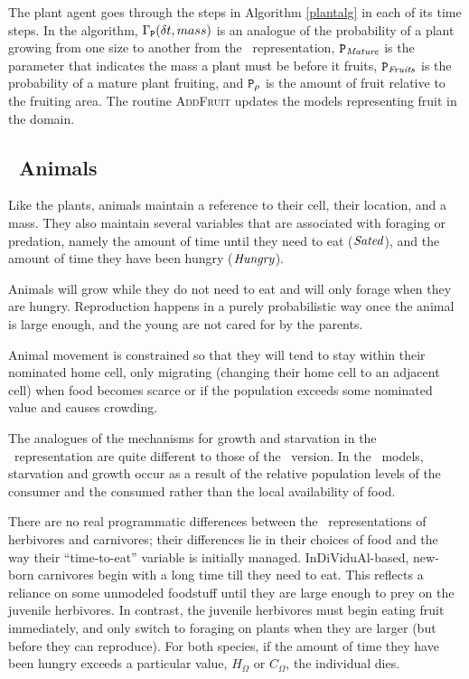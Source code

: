 
The plant agent goes through the steps in Algorithm {\ref{plantalg}} in each
of its time steps. In the algorithm, $\Gamma_{\mathtt{P}}(\delta t, mass)$ is an
analogue of the probability of a plant growing from one size to another from
the \SD\ rep\-re\-sen\-ta\-tion, $\texttt{P}_{\mathit{Mature}}$ is the parameter that indicates
the mass a plant must be before it fruits, $\texttt{P}_{\mathit{Fruits}}$ is the
probability of a mature plant fruiting, and $\texttt{P}_\rho$ is the amount of
fruit relative to the fruiting area. The routine \textsc{AddFruit} updates the
models representing fruit in the domain.

\subsection{\IB\ Animals}

Like the plants, animals maintain a reference to their cell, their
location, and a mass. They also maintain several variables that are
associated with foraging or predation, namely the amount of time until
they need to eat ($\mathit{Sated}$), and the amount of time they have been
hungry ($\mathit{Hungry}$).

Animals will grow while they do not need to eat and will only forage
when they are hungry.  Reproduction happens in a purely probabilistic
way once the animal is large enough, and the young are not cared for
by the parents.

Animal movement is constrained so that they will tend to stay within
their nominated home cell, only migrating (changing their home cell to
an adjacent cell) when food becomes scarce or if the population
exceeds some nominated value and causes crowding.

The analogues of the mechanisms for growth and starvation in the
\SD\ rep\-re\-sen\-ta\-tion are quite different to those of the \IB\ version.
In the \SD\ models, starvation and growth occur as a result of the
relative population levels of the consumer and the consumed rather
than the local availability of food.

There are no real programmatic differences between the
\IB\ rep\-re\-sen\-ta\-tions of herbivores and carnivores; their differences
lie in their choices of food and the way their ``time-to-eat''
variable is initially managed. In\-Di\-Vidu\-Al-based, new-born carnivores
begin with a long time till they need to eat. This reflects a reliance
on some unmodeled foodstuff until they are large enough to prey on
the juvenile herbivores.  In contrast, the juvenile herbivores must
begin eating fruit immediately, and only switch to foraging on plants
when they are larger (but before they can reproduce). For both
species, if the amount of time they have been hungry exceeds a
particular value, $H_\Omega$ or $C_\Omega$, the in\-di\-vidu\-al dies.

